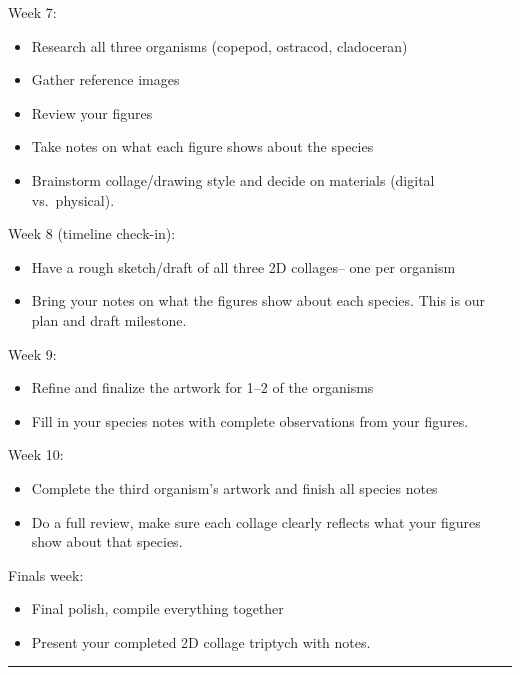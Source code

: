 \documentclass[
  letterpaper,
  DIV=11,
  numbers=noendperiod]{scrartcl}
\providecommand{\tightlist}{%
  \setlength{\itemsep}{0pt}\setlength{\parskip}{0pt}}
\begin{document}
Week 7:

\begin{itemize}
\tightlist
\item
  Research all three organisms (copepod, ostracod, cladoceran)
\item
  Gather reference images
\item
  Review your figures
\item
  Take notes on what each figure shows about the species
\item
  Brainstorm collage/drawing style and decide on materials (digital
  vs.~physical).
\end{itemize}

Week 8 (timeline check-in):

\begin{itemize}
\tightlist
\item
  Have a rough sketch/draft of all three 2D collages-- one per organism
\item
  Bring your notes on what the figures show about each species. This is
  our plan and draft milestone.
\end{itemize}

Week 9:

\begin{itemize}
\tightlist
\item
  Refine and finalize the artwork for 1--2 of the organisms
\item
  Fill in your species notes with complete observations from your
  figures.
\end{itemize}

Week 10:

\begin{itemize}
\tightlist
\item
  Complete the third organism's artwork and finish all species notes
\item
  Do a full review, make sure each collage clearly reflects what your
  figures show about that species.
\end{itemize}

Finals week:

\begin{itemize}
\tightlist
\item
  Final polish, compile everything together
\item
  Present your completed 2D collage triptych with notes.
\end{itemize}

\begin{center}\rule{0.5\linewidth}{0.5pt}\end{center}
\end{document}

